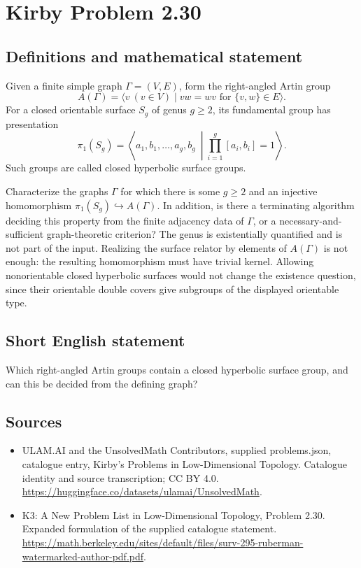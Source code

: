 \documentclass[11pt,a4paper]{article}
\begin{document}
\section*{Kirby Problem 2.30}\label{statement}

\subsection{Definitions and mathematical statement}
Given a finite simple graph $\Gamma=(V,E)$, form the right-angled Artin group
\[
A(\Gamma)=\langle v\ (v\in V)\mid vw=wv\text{ for }\{v,w\}\in E\rangle.
\]
For a closed orientable surface $S_g$ of genus $g\geq2$, its fundamental group
has presentation
\[
\pi_1(S_g)=\left\langle a_1,b_1,\ldots,a_g,b_g\ \middle|
\prod_{i=1}^g[a_i,b_i]=1\right\rangle.
\]
Such groups are called closed hyperbolic surface groups.

Characterize the graphs $\Gamma$ for which there is some $g\geq2$ and an
injective homomorphism $\pi_1(S_g)\hookrightarrow A(\Gamma)$.
In addition, is there a terminating algorithm deciding this property from
the finite adjacency data of $\Gamma$, or a necessary-and-sufficient
graph-theoretic criterion?
The genus is existentially quantified and is not part of the input. Realizing
the surface relator by elements of $A(\Gamma)$ is not enough: the resulting
homomorphism must have trivial kernel. Allowing nonorientable closed hyperbolic
surfaces would not change the existence question, since their orientable double
covers give subgroups of the displayed orientable type.
\subsection{Short English statement}
Which right-angled Artin groups contain a closed hyperbolic surface group, and can this be decided from the defining graph?
\subsection{Sources}
\begin{itemize}
\item[S1] ULAM.AI and the UnsolvedMath Contributors, supplied problems.json, catalogue entry, Kirby's Problems in Low-Dimensional Topology. Catalogue identity and source transcription; CC BY 4.0.
\url{https://huggingface.co/datasets/ulamai/UnsolvedMath}.
\item[S2] K3: A New Problem List in Low-Dimensional Topology, Problem 2.30. Expanded formulation of the supplied catalogue statement.
\url{https://math.berkeley.edu/sites/default/files/surv-295-ruberman-watermarked-author-pdf.pdf}.
\end{itemize}
\end{document}
